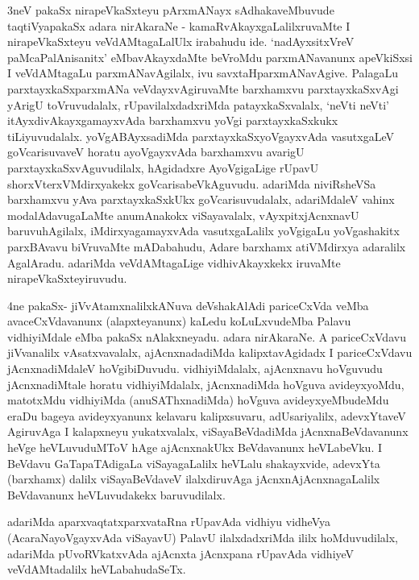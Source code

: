 \begin{artha}
3neV pakaSx nirapeVkaSxteyu pArxmANayx sAdhakaveMbuvude taqtiVyapakaSx
adara nirAkaraNe - kamaRvAkayxgaLalilxruvaMte I nirapeVkaSxteyu
veVdAMtagaLalUlx irabahudu ide. `nadAyxsitxVreV paMcaPalAnisanitx' eMbavAkayxdaMte beVroMdu
parxmANavanunx apeVkiSxsi I veVdAMtagaLu parxmANavAgilalx, ivu
savxtaHparxmANavAgive. PalagaLu parxtayxkaSxparxmANa veVdayxvAgiruvaMte
barxhamxvu parxtayxkaSxvAgi yArigU toVruvudalalx, rUpavilalxdadxriMda
patayxkaSxvalalx, `neVti neVti' itAyxdivAkayxgamayxvAda barxhamxvu
yoVgi parxtayxkaSxkukx tiLiyuvudalalx. yoVgABAyxsadiMda
parxtayxkaSxyoVgayxvAda vasutxgaLeV goVcarisuvaveV horatu
ayoVgayxvAda barxhamxvu avarigU parxtayxkaSxvAguvudilalx, hAgidadxre
AyoVgigaLige rUpavU shorxVterxVMdirxyakekx
goVcarisabeVkAguvudu. adariMda niviRsheVSa barxhamxvu yAva
parxtayxkaSxkUkx goVcarisuvudalalx, adariMdaleV vahinx
modalAdavugaLaMte anumAnakokx viSayavalalx, vAyxpitxjAcnxnavU
 baruvuhAgilalx, iMdirxyagamayxvAda vasutxgaLalilx yoVgigaLu
yoVgashakitx parxBAvavu biVruvaMte mADabahudu, Adare barxhamx
atiVMdirxya adaralilx AgalAradu.  adariMda veVdAMtagaLige
vidhivAkayxkekx iruvaMte nirapeVkaSxteyiruvudu.
\end{artha}

\begin{artha}
4ne pakaSx- jiVvAtamxnalilxkANuva deVshakAlAdi pariceCxVda veMba
avaceCxVdavanunx (alapxteyanunx) kaLedu koLuLxvudeMba Palavu
vidhiyiMdale eMba pakaSx nAlakxneyadu. adara
nirAkaraNe. A pariceCxVdavu jiVvanalilx vAsatxvavalalx, ajAcnxnadadiMda
kalipxtavAgidadx I pariceCxVdavu jAcnxnadiMdaleV
hoVgibiDuvudu. vidhiyiMdalalx, ajAcnxnavu	hoVguvudu jAcnxnadiMtale
horatu vidhiyiMdalalx, jAcnxnadiMda hoVguva avideyxyoMdu, matotxMdu
vidhiyiMda (anuSAThxnadiMda) hoVguva avideyxyeMbudeMdu eraDu bageya
avideyxyanunx kelavaru kalipxsuvaru, adUsariyalilx, adevxYtaveV
AgiruvAga I kalapxneyu yukatxvalalx, viSayaBeVdadiMda
jAcnxnaBeVdavanunx heVge heVLuvuduMToV hAge ajAcnxnakUkx BeVdavanunx
heVLabeVku. I BeVdavu GaTapaTAdigaLa viSayagaLalilx heVLalu
shakayxvide, adevxYta (barxhamx) dalilx viSayaBeVdaveV ilalxdiruvAga
jAcnxnA\s jAcnxnagaLalilx BeVdavanunx heVLuvudakekx baruvudilalx.

adariMda aparxvaqtatxparxvataRna rUpavAda vidhiyu vidheVya
(AcaraNayoVgayxvAda viSayavU) PalavU ilalxdadxriMda ililx
hoMduvudilalx, adariMda pUvoRVkatxvAda ajAcnxta jAcnxpana rUpavAda
vidhiyeV veVdAMtadalilx heVLabahudaSeTx.
\end{artha}

\centerline{}

